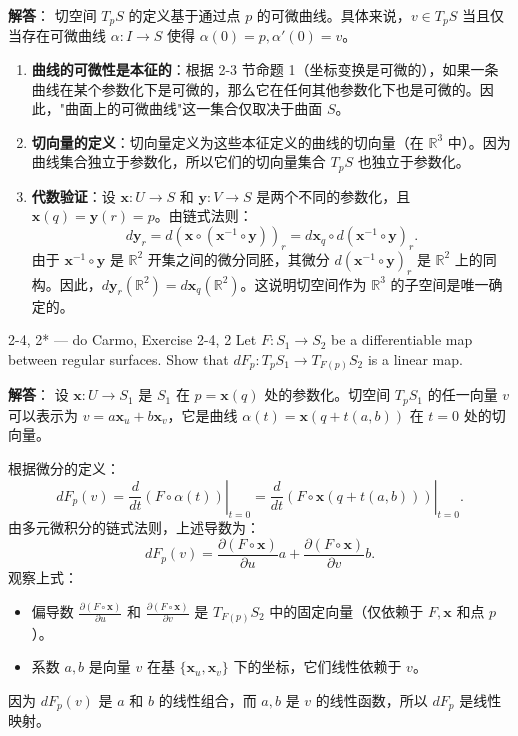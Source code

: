 \begin{solution}
\textbf{解答}：
切空间 $T_pS$ 的定义基于通过点 $p$ 的可微曲线。具体来说，$v \in T_pS$ 当且仅当存在可微曲线 $\alpha: I \to S$ 使得 $\alpha(0) = p, \alpha'(0) = v$。

\begin{enumerate}
    \item \textbf{曲线的可微性是本征的}：根据 2-3 节命题 1（坐标变换是可微的），如果一条曲线在某个参数化下是可微的，那么它在任何其他参数化下也是可微的。因此，"曲面上的可微曲线"这一集合仅取决于曲面 $S$。
    \item \textbf{切向量的定义}：切向量定义为这些本征定义的曲线的切向量（在 $\mathbb{R}^3$ 中）。因为曲线集合独立于参数化，所以它们的切向量集合 $T_pS$ 也独立于参数化。
    \item \textbf{代数验证}：设 $\mathbf{x}: U \to S$ 和 $\mathbf{y}: V \to S$ 是两个不同的参数化，且 $\mathbf{x}(q) = \mathbf{y}(r) = p$。由链式法则：
    \[
    d\mathbf{y}_r = d(\mathbf{x} \circ (\mathbf{x}^{-1} \circ \mathbf{y}))_r = d\mathbf{x}_q \circ d(\mathbf{x}^{-1} \circ \mathbf{y})_r.
    \]
    由于 $\mathbf{x}^{-1} \circ \mathbf{y}$ 是 $\mathbb{R}^2$ 开集之间的微分同胚，其微分 $d(\mathbf{x}^{-1} \circ \mathbf{y})_r$ 是 $\mathbb{R}^2$ 上的同构。因此，$d\mathbf{y}_r(\mathbb{R}^2) = d\mathbf{x}_q(\mathbb{R}^2)$。这说明切空间作为 $\mathbb{R}^3$ 的子空间是唯一确定的。
\end{enumerate}
\end{solution}

\begin{exercise}{2-4, 2* — do Carmo, Exercise 2-4, 2}
Let $F: S_1 \to S_2$ be a differentiable map between regular surfaces. Show that $dF_p: T_pS_1 \to T_{F(p)}S_2$ is a linear map.
\end{exercise}

\begin{solution}
\textbf{解答}：
设 $\mathbf{x}: U \to S_1$ 是 $S_1$ 在 $p = \mathbf{x}(q)$ 处的参数化。切空间 $T_pS_1$ 的任一向量 $v$ 可以表示为 $v = a \mathbf{x}_u + b \mathbf{x}_v$，它是曲线 $\alpha(t) = \mathbf{x}(q + t(a, b))$ 在 $t=0$ 处的切向量。

根据微分的定义：
\[
dF_p(v) = \left. \frac{d}{dt} (F \circ \alpha(t)) \right|_{t=0} = \left. \frac{d}{dt} (F \circ \mathbf{x}(q + t(a, b))) \right|_{t=0}.
\]
由多元微积分的链式法则，上述导数为：
\[
dF_p(v) = \frac{\partial(F \circ \mathbf{x})}{\partial u} a + \frac{\partial(F \circ \mathbf{x})}{\partial v} b.
\]
观察上式：
\begin{itemize}
    \item 偏导数 $\frac{\partial(F \circ \mathbf{x})}{\partial u}$ 和 $\frac{\partial(F \circ \mathbf{x})}{\partial v}$ 是 $T_{F(p)}S_2$ 中的固定向量（仅依赖于 $F, \mathbf{x}$ 和点 $p$）。
    \item 系数 $a, b$ 是向量 $v$ 在基 $\{\mathbf{x}_u, \mathbf{x}_v\}$ 下的坐标，它们线性依赖于 $v$。
\end{itemize}
因为 $dF_p(v)$ 是 $a$ 和 $b$ 的线性组合，而 $a, b$ 是 $v$ 的线性函数，所以 $dF_p$ 是线性映射。
\end{solution}

